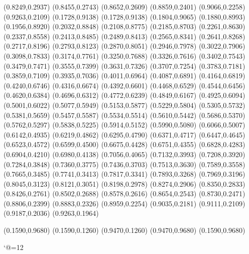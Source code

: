 \PST@Diamond(0.8249,0.2937)
\PST@Diamond(0.8455,0.2743)
\PST@Diamond(0.8652,0.2609)
\PST@Diamond(0.8859,0.2401)
\PST@Diamond(0.9066,0.2258)
\PST@Diamond(0.9263,0.2109)
\PST@Dashed(0.1728,0.9138)
(0.1728,0.9138)
(0.1804,0.9065)
(0.1880,0.8993)
(0.1956,0.8920)
(0.2032,0.8848)
(0.2108,0.8775)
(0.2185,0.8703)
(0.2261,0.8630)
(0.2337,0.8558)
(0.2413,0.8485)
(0.2489,0.8413)
(0.2565,0.8341)
(0.2641,0.8268)
(0.2717,0.8196)
(0.2793,0.8123)
(0.2870,0.8051)
(0.2946,0.7978)
(0.3022,0.7906)
(0.3098,0.7833)
(0.3174,0.7761)
(0.3250,0.7688)
(0.3326,0.7616)
(0.3402,0.7543)
(0.3479,0.7471)
(0.3555,0.7399)
(0.3631,0.7326)
(0.3707,0.7254)
(0.3783,0.7181)
(0.3859,0.7109)
(0.3935,0.7036)
(0.4011,0.6964)
(0.4087,0.6891)
(0.4164,0.6819)
(0.4240,0.6746)
(0.4316,0.6674)
(0.4392,0.6601)
(0.4468,0.6529)
(0.4544,0.6456)
(0.4620,0.6384)
(0.4696,0.6312)
(0.4772,0.6239)
(0.4849,0.6167)
(0.4925,0.6094)
(0.5001,0.6022)
(0.5077,0.5949)
(0.5153,0.5877)
(0.5229,0.5804)
(0.5305,0.5732)
(0.5381,0.5659)
(0.5457,0.5587)
(0.5534,0.5514)
(0.5610,0.5442)
(0.5686,0.5370)
(0.5762,0.5297)
(0.5838,0.5225)
(0.5914,0.5152)
(0.5990,0.5080)
(0.6066,0.5007)
(0.6142,0.4935)
(0.6219,0.4862)
(0.6295,0.4790)
(0.6371,0.4717)
(0.6447,0.4645)
(0.6523,0.4572)
(0.6599,0.4500)
(0.6675,0.4428)
(0.6751,0.4355)
(0.6828,0.4283)
(0.6904,0.4210)
(0.6980,0.4138)
(0.7056,0.4065)
(0.7132,0.3993)
(0.7208,0.3920)
(0.7284,0.3848)
(0.7360,0.3775)
(0.7436,0.3703)
(0.7513,0.3630)
(0.7589,0.3558)
(0.7665,0.3485)
(0.7741,0.3413)
(0.7817,0.3341)
(0.7893,0.3268)
(0.7969,0.3196)
(0.8045,0.3123)
(0.8121,0.3051)
(0.8198,0.2978)
(0.8274,0.2906)
(0.8350,0.2833)
(0.8426,0.2761)
(0.8502,0.2688)
(0.8578,0.2616)
(0.8654,0.2543)
(0.8730,0.2471)
(0.8806,0.2399)
(0.8883,0.2326)
(0.8959,0.2254)
(0.9035,0.2181)
(0.9111,0.2109)
(0.9187,0.2036)
(0.9263,0.1964)

\PST@Border(0.1590,0.9680)
(0.1590,0.1260)
(0.9470,0.1260)
(0.9470,0.9680)
(0.1590,0.9680)

\catcode`@=12
\fi
\endpspicture
